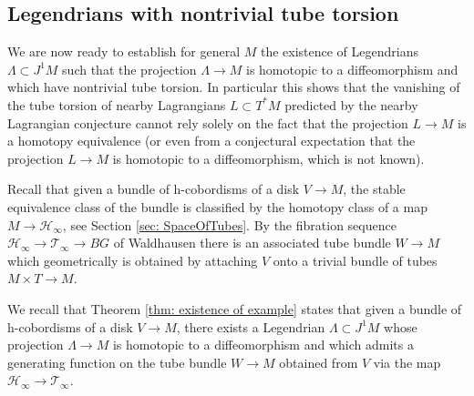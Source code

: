 \documentclass{amsart}
\newcommand\cH{\mathcal{H}}
\newcommand\cT{\mathcal{T}}
\def\bR{\mathbf{R}}
\theoremstyle{definition}
\newtheorem{definition}[theorem]{Definition}
\theoremstyle{remark}
\newtheorem{inductive lemma}[theorem]{Inductive Lemma}
\begin{document}
\subsection{Legendrians with nontrivial tube torsion}\label{sec: nontriv}

We are now ready to establish for general $M$ the existence of Legendrians $\Lambda \subset J^1M$ such that the projection $\Lambda \to M$ is homotopic to a diffeomorphism and which have nontrivial tube torsion. In particular this shows that the vanishing of the tube torsion of nearby Lagrangians $L \subset T^*M$ predicted by the nearby Lagrangian conjecture cannot rely solely on the fact that the projection $L \to M$ is a homotopy equivalence (or even from a conjectural expectation that the projection $L \to M$ is homotopic to a diffeomorphism, which is not known).

Recall that given a bundle of h-cobordisms of a disk $V \to M$, the stable equivalence class of the bundle is classified by the homotopy class of a map $M \to \cH_\infty$, see Section \ref{sec: SpaceOfTubes}. By the fibration sequence $\cH_\infty \to \cT_\infty \to BG$ of Waldhausen \cite{W82} there is an associated tube bundle $W \to M$ which geometrically is obtained by attaching $V$ onto a trivial bundle of tubes $M \times T \to M$. 

We recall that Theorem \ref{thm: existence of example} states that given a bundle of h-cobordisms of a disk $V  \to M$, there exists a Legendrian $\Lambda \subset J^1M$ whose projection $\Lambda \to M$ is homotopic to a diffeomorphism and which admits a generating function on the tube bundle $W \to M$ obtained from $V$ via the map $\cH_\infty \to \cT_\infty$. 

\end{document}
